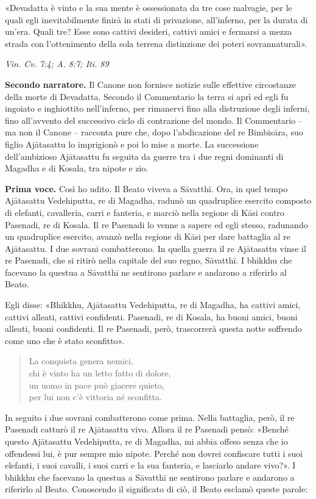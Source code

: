 «Devadatta è vinto e la sua mente è ossessionata da tre cose malvagie,
per le quali egli inevitabilmente finirà in stati di privazione,
all’inferno, per la durata di un’era. Quali tre? Esse sono cattivi
desideri, cattivi amici e fermarsi a mezza strada con l’ottenimento
della sola terrena distinzione dei poteri sovrannaturali».


\emph{Vin. Cv. 7:4; A. 8:7; Iti. 89}


\textbf{Secondo narratore.} Il Canone non fornisce notizie sulle effettive
circostanze della morte di Devadatta. Secondo il Commentario la terra si
aprì ed egli fu ingoiato e inghiottito nell’inferno, per rimanervi fino
alla distruzione degli inferni, fino all’avvento del successivo ciclo di
contrazione del mondo. Il Commentario – ma non il Canone – racconta pure
che, dopo l’abdicazione del re Bimbisāra, suo figlio Ajātasattu lo
imprigionò e poi lo mise a morte. La successione dell’ambizioso
Ajātasattu fu seguita da guerre tra i due regni dominanti di Magadha e
di Kosala, tra nipote e zio.


\textbf{Prima voce.} Così ho udito. Il Beato viveva a Sāvatthī. Ora, in quel
tempo Ajātasattu Vedehiputta, re di Magadha, radunò un quadruplice
esercito composto di elefanti, cavalleria, carri e fanteria, e marciò
nella regione di Kāsi contro Pasenadi, re di Kosala. Il re Pasenadi lo
venne a sapere ed egli stesso, radunando un quadruplice esercito, avanzò
nella regione di Kāsi per dare battaglia al re Ajātasattu. I due sovrani
combatterono. In quella guerra il re Ajātasattu vinse il re Pasenadi,
che si ritirò nella capitale del suo regno, Sāvatthī. I bhikkhu che
facevano la questua a Sāvatthī ne sentirono parlare e andarono a
riferirlo al Beato.


Egli disse: «Bhikkhu, Ajātasattu Vedehiputta, re di Magadha, ha cattivi amici,
cattivi alleati, cattivi confidenti. Pasenadi, re di Kosala, ha buoni
amici, buoni alleati, buoni confidenti. Il re Pasenadi, però,
trascorrerà questa notte soffrendo come uno che è stato sconfitto».


\begin{quotation}
La conquista genera nemici, \\
chi è vinto ha un letto fatto di dolore, \\
un uomo in pace può giacere quieto, \\
per lui non c’è vittoria né sconfitta.
\end{quotation}

In seguito i due sovrani combatterono come prima. Nella battaglia, però,
il re Pasenadi catturò il re Ajātasattu vivo. Allora il re Pasenadi
pensò: «Benché questo Ajātasattu Vedehiputta, re di Magadha, mi abbia
offeso senza che io offendessi lui, è pur sempre mio nipote. Perché non
dovrei confiscare tutti i suoi elefanti, i suoi cavalli, i suoi carri e
la sua fanteria, e lasciarlo andare vivo?». I bhikkhu che facevano la
questua a Sāvatthī ne sentirono parlare e andarono a riferirlo al Beato.
Conoscendo il significato di ciò, il Beato esclamò queste parole:


